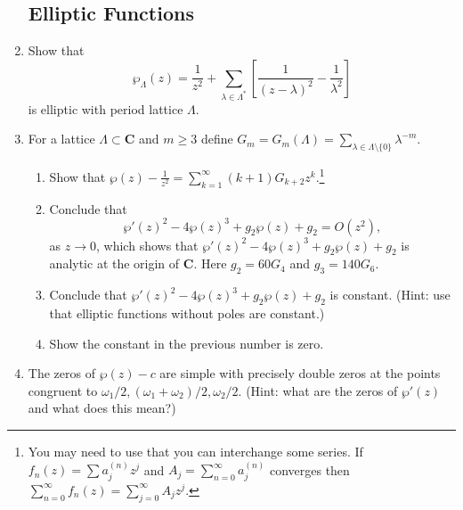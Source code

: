 \documentclass[a4paper,10pt]{article}
\newcommand{\CC}{\mathbf{C}}
\begin{document}
\begin{enumerate}
\subsection*{Elliptic Functions} 
\item Show that 
 $$ \wp_{\Lambda}(z) = \frac{1}{z^2} + \sum_{\lambda \in \Lambda^*} \left[ \frac{1}{(z-\lambda)^2} - \frac{1}{\lambda^2} \right] $$
is elliptic with period lattice $\Lambda$.

\item For a lattice $\Lambda \subset \CC$ and $m\geq 3$ define $G_m = G_m(\Lambda) =  \sum_{\lambda \in \Lambda\setminus \lbrace 0 \rbrace } \lambda^{-m}. $   
\begin{enumerate}
  \item Show that $ \wp(z) - \frac{1}{z^2} = \sum_{k=1}^{\infty} (k+1)G_{k+2} z^k.$\footnote{You may need to use that you can interchange some series. If $f_n(z) = \sum a_j^{(n)} z^j$ and $A_j = \sum_{n=0}^{\infty} a_j^{(n)} $ converges then $\sum_{n=0}^{\infty} f_n(z) = \sum_{j=0}^{\infty} A_j z^j$. } 
 \item Conclude that 
  $$ \wp'(z)^2 - 4 \wp(z)^3 + g_2 \wp(z) + g_2 = O(z^2),$$
 as $z \to 0$, which shows that $\wp'(z)^2 - 4 \wp(z)^3 + g_2 \wp(z) + g_2$ is analytic at the origin of $\CC$. 
 Here $g_2 = 60 G_4$ and $g_3 = 140 G_6$.
 \item Conclude that $\wp'(z)^2 - 4 \wp(z)^3 + g_2 \wp(z) + g_2$ is constant. (Hint: use that elliptic functions without poles are constant.)
 \item Show the constant in the previous number is zero.
\end{enumerate}

\item The zeros of $\wp(z)-c$ are simple with precisely double zeros at the points congruent to $\omega_1/2, (\omega_1+\omega_2)/2, \omega_2/2$. (Hint: what are the zeros of $\wp'(z)$ and what does this mean?)

\end{enumerate}
\end{document}
